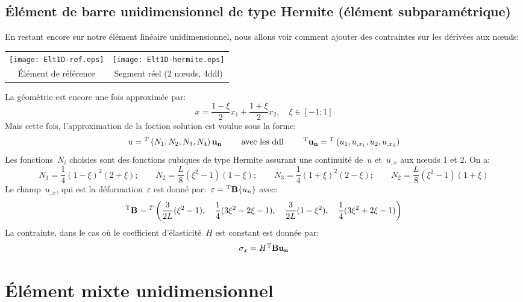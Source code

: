   \subsection{Élément de barre unidimensionnel de type Hermite (élément subparamétrique)}
\fi
En restant encore sur notre élément linéaire unidimensionnel, nous allons voir comment ajouter des
contraintes sur les dérivées aux nœuds:
\begin{table}[ht]\centering
\begin{tabular}{cc}
\texttt{[image: Elt1D-ref.eps]} &
\texttt{[image: Elt1D-hermite.eps]} \\
Élément de référence & Segment réel (2 nœuds, 4ddl)
\end{tabular}
\end{table}
\medskipvm
La géométrie est encore une fois approximée par:
\begin{equation} x=\frac{1-\xi}2 x_1 + \frac{1+\xi}2 x_2, \quad \xi\in[-1;1] \end{equation}
\medskipvm
Mais cette fois, l'approximation de la foction solution est voulue sous la forme:
\begin{equation}
u = \LLL{N_1, N_2, N_3, N_4}\VV{u_n} \qquad \text{ avec les ddl } \qquad
\LL{u_n}=\LLL{u_1, u_{,x_1}, u_2, u_{,x_2}} 
\end{equation}
\medskipvm
Les fonctions~$N_i$ choisies sont des fonctions cubiques de type Hermite assurant une continuité
de~$u$ et~$u_{,x}$ aux nœuds 1 et 2. On a:
\begin{equation}
N_1=\frac14(1-\xi)^2(2+\xi); \qquad
N_2=\frac{L}8(\xi^2-1)(1-\xi); \qquad
N_3=\frac14(1+\xi)^2(2-\xi); \qquad
N_2=\frac{L}8(\xi^2-1)(1+\xi)
\end{equation}
\medskipvm
Le champ~$u_{,x}$, qui est la déformation~$\varepsilon$ est donné par:~$\varepsilon={}^\mathrm{T}\mathbf{B}\{u_n\}$ avec:
\begin{equation} {}^\mathrm{T}\mathbf{B}={}^T\left( \frac3{2L}(\xi^2-1), \quad \frac14(3\xi^2-2\xi-1), \quad \frac3{2L}(1-\xi^2), \quad
\frac14(3\xi^2+2\xi-1)\right)\end{equation}
\medskipvm
La contrainte, dans le cas où le coefficient d'élasticité~$H$ est constant est
donnée par:
\begin{equation}\sigma_x=H \LL{B}\VV{u_n}\end{equation}
\medskipvm
\ifVersionAvecExemplesSepares
  \section{Élément mixte unidimensionnel}
\else
